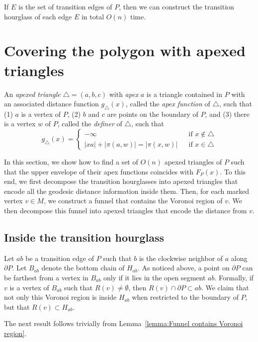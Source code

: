 \documentclass[a4paper,UKenglish]{lipics}
\newcommand{\F}[2]{\ensuremath{F_{\scriptscriptstyle #1}(#2)}}
\newcommand{\g}[2]{\ensuremath{|\pi(#1, #2)|}}
\begin{document}
\begin{lemma}\label{lemma: Hourglass partition}
If $E$ is the set of transition edges of $P$, then we can construct the transition hourglass of each edge $E$ in total $O(n)$ time.
\end{lemma}

\section{Covering the polygon with apexed triangles}\label{Section:Computing apexed triangles}
An \emph{apexed triangle} $\triangle = (a,b,c)$ with \emph{apex} $a$ is a triangle contained in $P$ with an associated distance function $g_\triangle(x)$, called the \emph{apex function} of $\triangle$, such that (1) $a$ is a vertex of $P$, (2) $b$ and $c$ are points on the boundary of $P$, and (3) there is a  vertex $w$ of  $P$, called the \emph{definer} of $\triangle$, such that
$$g_\triangle(x) = \left\{ \begin{array}{lll}
-\infty&&\text{if $x\notin \triangle$}\\
|xa| + \g{a}{w} = \g{x}{w} && \text{if $x\in \triangle$}
\end{array}\right.$$

In this section, we show how to find a set of $O(n)$ apexed triangles of $P$ such that the upper envelope of their apex functions coincides with $\F{P}{x}$.
To this end, we first decompose the transition hourglasses into apexed triangles that encode all the geodesic distance information inside them. Then, for each marked vertex $v\in M$, we construct a funnel that contains the Voronoi region of $v$.  We then decompose this funnel into apexed triangles that encode the distance from $v$.

\subsection{Inside the transition hourglass}
Let $ab$ be a transition edge of $P$  such that $b$ is the clockwise neighbor of $a$ along $\partial P$.
Let $B_{ab}$ denote the bottom chain of $H_{ab}$.
As noticed above, a point on $\partial P$ can be farthest from a vertex in $B_{ab}$ only if it lies in the open segment $ab$.
Formally, if $v$ is a vertex of $B_{ab}$ such that $R(v)\neq \emptyset$, then $R(v)\cap \partial P \subset ab$.
We claim that not only this Voronoi region is inside $H_{ab}$ when restricted to the boundary of $P$, but that $R(v)\subset H_{ab}$. 

The next result follows trivially from Lemma~\ref{lemma:Funnel contains Voronoi region}.
\end{document}
